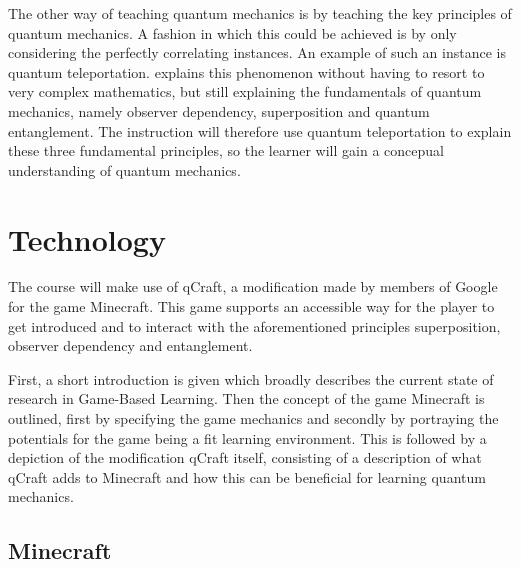 \documentclass[12pt]{report} %
\begin{document}
The other way of teaching quantum mechanics is by teaching the key principles of quantum mechanics. A fashion in which this could be achieved is by only considering the perfectly correlating instances. An example of such an instance is quantum teleportation.  explains this phenomenon without having to resort to very complex mathematics, but still explaining the fundamentals of quantum mechanics, namely observer dependency, superposition and quantum entanglement. The instruction will therefore use quantum teleportation to explain these three fundamental principles, so the learner will gain a concepual understanding of quantum mechanics.

\section{Technology}

The course will make use of qCraft, a modification made by members of Google for the game Minecraft. This game supports an accessible way for the player to get introduced and to interact with the aforementioned principles superposition, observer dependency and entanglement.

First, a short introduction is given which broadly describes the current state of research in Game-Based Learning. Then the concept of the game Minecraft is outlined, first by specifying the game mechanics and secondly by portraying the potentials for the game being a fit learning environment. This is followed by a depiction of the modification qCraft itself, consisting of a description of what qCraft adds to Minecraft and how this can be beneficial for learning quantum mechanics. 

\subsection{Minecraft}
\end{document}
